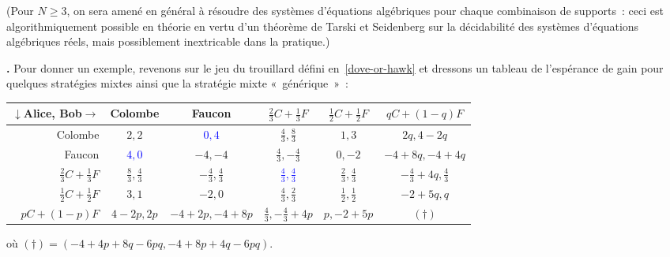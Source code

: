 \documentclass[12pt,a4paper]{article}
\theoremstyle{definition}
\newcommand\thingy{%
\refstepcounter{comcnt}\smallskip\noindent\textbf{\thecomcnt.} }
\begin{document}
(Pour $N\geq 3$, on sera amené en général à résoudre des systèmes
d'équations algébriques pour chaque combinaison de supports : ceci est
algorithmiquement possible en théorie en vertu d'un théorème de Tarski
et Seidenberg sur la décidabilité des systèmes d'équations algébriques
réels, mais possiblement inextricable dans la pratique.)

\thingy\label{dove-or-hawk-redux} Pour donner un exemple, revenons sur
le jeu du trouillard défini
en \ref{dove-or-hawk} et dressons un tableau de l'espérance de gain
pour quelques stratégies mixtes ainsi que la stratégie mixte
« générique » :

{\footnotesize
\begin{center}
\begin{tabular}{r|c|c|c|c|c|}
$\downarrow$Alice, Bob$\rightarrow$&Colombe&Faucon&$\frac{2}{3}C+\frac{1}{3}F$&$\frac{1}{2}C+\frac{1}{2}F$&$qC+(1-q)F$\\\hline
Colombe&$2,2$&\textcolor{blue}{$0,4$}&$\frac{4}{3},\frac{8}{3}$&$1,3$&{\tiny $2q, 4-2q$}\\\hline
Faucon&\textcolor{blue}{$4,0$}&$-4,-4$&$\frac{4}{3},-\frac{4}{3}$&$0,-2$&{\tiny $-4+8q, -4+4q$}\\\hline
$\frac{2}{3}C+\frac{1}{3}F$&$\frac{8}{3},\frac{4}{3}$&$-\frac{4}{3},\frac{4}{3}$&\textcolor{blue}{$\frac{4}{3},\frac{4}{3}$}&$\frac{2}{3},\frac{4}{3}$&{\tiny $-\frac{4}{3}+4q, \frac{4}{3}$}\\\hline
$\frac{1}{2}C+\frac{1}{2}F$&$3,1$&$-2,0$&$\frac{4}{3},\frac{2}{3}$&$\frac{1}{2},\frac{1}{2}$&$-2+5q,q$\\\hline
$pC+(1-p)F$&{\tiny $4-2p,2p$}&{\tiny $-4+2p,-4+8p$}&{\tiny $\frac{4}{3},-\frac{4}{3}+4p$}&{\tiny $p,-2+5p$}&$(\dagger)$\\\hline
\end{tabular}
\end{center}
\par\noindent
où $(\dagger) = (-4 + 4p + 8q - 6pq, - 4 + 8p + 4q - 6pq)$.
\par}

\smallskip
\end{document}
